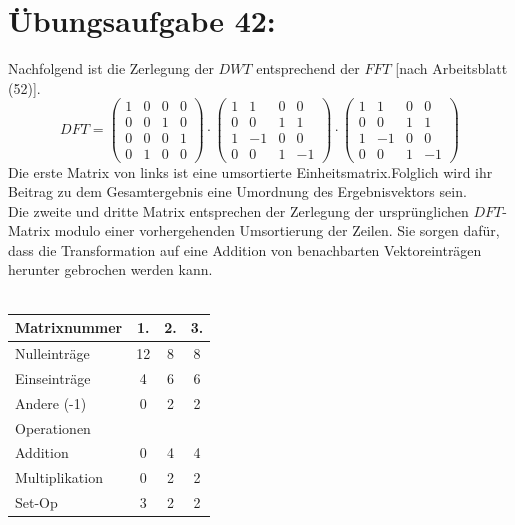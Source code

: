 

	\section*{Übungsaufgabe 42:}
		Nachfolgend ist die Zerlegung der $DWT$ entsprechend der $FFT$ [nach Arbeitsblatt (52)].
		$$
		DFT = \left(\begin{matrix} 1 &0 &0 &0 \\ 0& 0& 1& 0\\ 0& 0& 0& 1 \\ 0& 1& 0& 0\end{matrix}\right) \cdot
		\left(\begin{matrix} 1 &1 &0 &0 \\ 0& 0& 1& 1\\ 1& -1& 0& 0 \\ 0& 0& 1& -1\end{matrix}\right) \cdot
		\left(\begin{matrix} 1 &1 &0 &0 \\ 0& 0& 1& 1\\ 1& -1& 0& 0 \\ 0& 0& 1& -1\end{matrix}\right)
		$$
		Die erste Matrix von links ist eine umsortierte Einheitsmatrix.Folglich wird ihr Beitrag zu dem Gesamtergebnis eine Umordnung des Ergebnisvektors sein.\\
		Die zweite und dritte Matrix entsprechen der Zerlegung der ursprünglichen $DFT$-Matrix modulo einer vorhergehenden Umsortierung der Zeilen. Sie sorgen dafür, dass die Transformation auf eine Addition von benachbarten Vektoreinträgen herunter gebrochen werden kann.\\
		\\
		\begin{tabular}{l | c c c }
			Matrixnummer	&	1.	&	2.	&	3.\\
			\hline
			Nulleinträge	&	12	&	8	&	8\\
			Einseinträge	&	4	&	6	&	6\\
			Andere (-1)		&	0	&	2	&	2\\
			\hline
			Operationen &&&\\
			Addition		&	0	&	4	&	4\\
			Multiplikation	&	0	&	2	&	2\\
			Set-Op			&	3	&	2	&	2\\
		\end{tabular}\\
